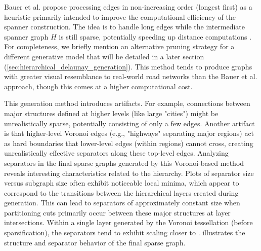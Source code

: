 Bauer et al. propose processing edges in non-increasing order (longest first) as a heuristic primarily intended to improve the computational efficiency of the spanner construction.
The idea is to handle long edges while the intermediate spanner graph \(H\) is still sparse, potentially speeding up distance computations \cite{hutchison_synthetic_2010}.
For completeness, we briefly mention an alternative pruning strategy for a different generative model that will be detailed in a later section (\cref{sec:hierarchical_delaunay_generation}).
This method tends to produce graphs with greater visual resemblance to real-world road networks than the Bauer et al. approach, though this comes at a higher computational cost.

This generation method introduces artifacts.
For example, connections between major structures defined at higher levels (like large "cities") might be unrealistically sparse, potentially consisting of only a few edges.
Another artifact is that higher-level Voronoi edges (e.g., "highways" separating major regions) act as hard boundaries that lower-level edges (within regions) cannot cross, creating unrealistically effective separators along these top-level edges.
Analyzing separators in the final sparse graphs generated by this Voronoi-based method reveals interesting characteristics related to the hierarchy.
Plots of separator size versus subgraph size often exhibit noticeable local minima, which appear to correspond to the transitions between the hierarchical layers created during generation.
This can lead to separators of approximately constant size when partitioning cuts primarily occur between these major structures at layer intersections.
Within a single layer generated by the Voronoi tessellation (before sparsification), the separators tend to exhibit scaling closer to .
 illustrates the structure and separator behavior of the final sparse graph.

